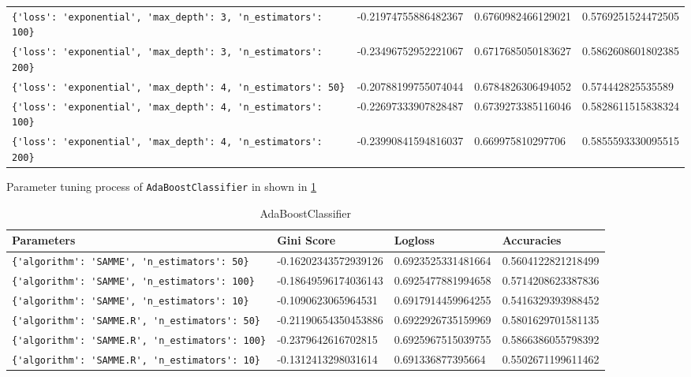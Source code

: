 \begin{table}
\begin{tabular}{llll}
\verb|{'loss': 'exponential', 'max_depth': 3, 'n_estimators': 100}| & -0.21974755886482367 & 0.6760982466129021 & 0.5769251524472505 \\ 
\verb|{'loss': 'exponential', 'max_depth': 3, 'n_estimators': 200}| & -0.23496752952221067 & 0.6717685050183627 & 0.5862608601802385 \\ 
\verb|{'loss': 'exponential', 'max_depth': 4, 'n_estimators': 50}| & -0.20788199755074044 & 0.6784826306494052 & 0.574442825535589 \\ 
\verb|{'loss': 'exponential', 'max_depth': 4, 'n_estimators': 100}| & -0.22697333907828487 & 0.6739273385116046 & 0.5828611515838324 \\ 
\verb|{'loss': 'exponential', 'max_depth': 4, 'n_estimators': 200}| & -0.23990841594816037 & 0.669975810297706 & 0.5855593330095515 \\ 
\bottomrule
\end{tabular}
\end{table} 

Parameter tuning process of \verb|AdaBoostClassifier| in shown in \cref{pt:AdaBoostClassifier} 

\begin{table} \centering
\caption{AdaBoostClassifier} 
\label{pt:AdaBoostClassifier} 
\begin{tabular}{llll}\toprule\bfseries Parameters & \bfseries Gini Score & \bfseries Logloss &\bfseries Accuracies \\\midrule 
\verb|{'algorithm': 'SAMME', 'n_estimators': 50}| & -0.16202343572939126 & 0.6923525331481664 & 0.5604122821218499 \\ 
\verb|{'algorithm': 'SAMME', 'n_estimators': 100}| & -0.18649596174036143 & 0.6925477881994658 & 0.5714208623387836 \\ 
\verb|{'algorithm': 'SAMME', 'n_estimators': 10}| & -0.1090623065964531 & 0.6917914459964255 & 0.5416329393988452 \\ 
\verb|{'algorithm': 'SAMME.R', 'n_estimators': 50}| & -0.21190654350453886 & 0.6922926735159969 & 0.5801629701581135 \\ 
\verb|{'algorithm': 'SAMME.R', 'n_estimators': 100}| & -0.2379642616702815 & 0.6925967515039755 & 0.5866386055798392 \\ 
\verb|{'algorithm': 'SAMME.R', 'n_estimators': 10}| & -0.1312413298031614 & 0.691336877395664 & 0.5502671199611462 \\ 
\bottomrule
\end{tabular}
\end{table} 

